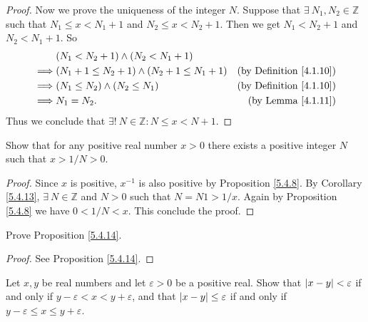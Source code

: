 \begin{proof}
Now we prove the uniqueness of the integer \(N\).
Suppose that \(\exists\ N_1, N_2 \in \mathds{Z}\) such that \(N_1 \leq x < N_1 + 1\) and \(N_2 \leq x < N_2 + 1\).
Then we get \(N_1 < N_2 + 1\) and \(N_2 < N_1 + 1\).
So
\begin{align*}
& (N_1 < N_2 + 1) \land (N_2 < N_1 + 1) \\
\implies & (N_1 + 1 \leq N_2 + 1) \land (N_2 + 1 \leq N_1 + 1) & \text{(by Definition \ref{4.1.10})} \\
\implies & (N_1 \leq N_2) \land (N_2 \leq N_1) & \text{(by Definition \ref{4.1.10})} \\
\implies & N_1 = N_2. & \text{(by Lemma \ref{4.1.11})}
\end{align*}
Thus we conclude that \(\exists!\ N \in \mathds{Z} : N \leq x < N + 1\).
\end{proof}

\begin{exercise}\label{ex 5.4.4}
Show that for any positive real number \(x > 0\) there exists a positive integer \(N\) such that \(x > 1 / N > 0\).
\end{exercise}

\begin{proof}
Since \(x\) is positive, \(x^{-1}\) is also positive by Proposition \ref{5.4.8}.
By Corollary \ref{5.4.13}, \(\exists\ N \in \mathds{Z}\) and \(N > 0\) such that \(N = N1 > 1 / x\).
Again by Proposition \ref{5.4.8} we have \(0 < 1 / N < x\).
This conclude the proof.
\end{proof}

\begin{exercise}\label{ex 5.4.5}
Prove Proposition \ref{5.4.14}.
\end{exercise}

\begin{proof}
See Proposition \ref{5.4.14}.
\end{proof}

\begin{exercise}\label{ex 5.4.6}
Let \(x, y\) be real numbers and let \(\varepsilon > 0\) be a positive real.
Show that \(\abs*{x - y} < \varepsilon\) if and only if \(y - \varepsilon < x < y + \varepsilon\), and that \(\abs*{x - y} \leq \varepsilon\) if and only if \(y - \varepsilon \leq x \leq y + \varepsilon\).
\end{exercise}


